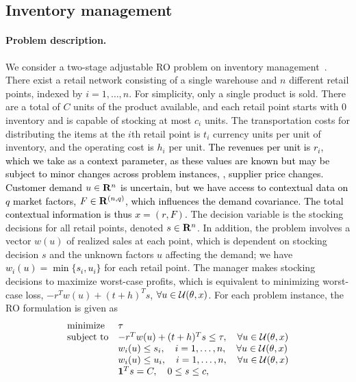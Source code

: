 \documentclass[11pt]{article}
\newcommand{\RC}[1]{\textcolor{black}{#1}}
\begin{document}
\subsection{Inventory management}
\paragraph{Problem description. } We consider a two-stage adjustable \gls{RO} problem on inventory management~\citep[Section 5.2.1]{pareto}. There exist a retail network consisting of a single warehouse and $n$ different retail points, indexed by $i = 1, \dots, n$. For simplicity, only a single product is sold.
There are a total of $C$ units of the product available, and each retail point starts with $0$ inventory and is capable of stocking at most $c_i$ units.
The transportation costs for distributing the items at the $i$th retail point is $t_i$ currency units per unit of inventory, and the operating cost is $h_i$ per unit.
\RC{The revenues per unit is $r_i$, which we take as a context parameter, as these values are known but may be subject to minor changes across problem instances, \ie, supplier price changes. 
Customer demand $u \in {\mathbf R}^n$ is uncertain, but we have access to contextual data on $q$ market factors, $F \in {\mathbf R}^{(n,q)}$, which influences the demand covariance.
The total contextual information is thus $x = (r,F)$.}
The decision variable is the stocking decisions for all retail points, denoted $s \in {\mathbf R}^n$.
In addition, the problem involves a vector $w(u)$ of realized sales at each point, which is dependent on stocking decision $s$ and the unknown factors $u$ affecting the demand; we have
\RC{$w_i(u) = \min\{s_i,u_i\} $}
for each retail point.
The manager makes stocking decisions to maximize worst-case profits, which is equivalent to minimizing worst-case loss, 
$-r^Tw(u) + (t+h)^Ts$, $\forall u\in {\mathcal{U}}(\theta,x)$.
For each problem instance, the \gls{RO} formulation is given as
\begin{equation}
	\label{eq:inv_1}
	\begin{array}{ll}
		\mbox{minimize} & \tau\\
		\mbox{subject to} & -r^Tw(u) + (t+h)^Ts \le \tau, \quad \forall u\in {\mathcal{U}}(\theta,x)\\
		& w_i(u) \leq s_i, \quad i = 1, \dots, n, \quad \forall u\in {\mathcal{U}}(\theta,x)\\
		& w_i(u) \leq u_i, \quad i = 1, \dots, n, \quad \forall u\in {\mathcal{U}}(\theta,x)\\
			& \mathbf 1^Ts = C,\quad 0 \le s \leq c,\\
	\end{array}
\end{equation}
\end{document}
